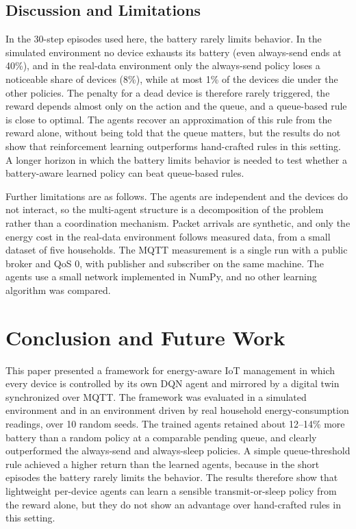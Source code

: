 \documentclass[conference]{IEEEtran}
\begin{document}
\subsection{Discussion and Limitations}
In the 30-step episodes used here, the battery rarely limits behavior. In the simulated environment no device exhausts its battery (even always-send ends at 40\%), and in the real-data environment only the always-send policy loses a noticeable share of devices (8\%), while at most 1\% of the devices die under the other policies. The penalty for a dead device is therefore rarely triggered, the reward depends almost only on the action and the queue, and a queue-based rule is close to optimal. The agents recover an approximation of this rule from the reward alone, without being told that the queue matters, but the results do not show that reinforcement learning outperforms hand-crafted rules in this setting. A longer horizon in which the battery limits behavior is needed to test whether a battery-aware learned policy can beat queue-based rules.

Further limitations are as follows. The agents are independent and the devices do not interact, so the multi-agent structure is a decomposition of the problem rather than a coordination mechanism. Packet arrivals are synthetic, and only the energy cost in the real-data environment follows measured data, from a small dataset of five households. The MQTT measurement is a single run with a public broker and QoS 0, with publisher and subscriber on the same machine. The agents use a small network implemented in NumPy, and no other learning algorithm was compared.

\section{Conclusion and Future Work}
\label{sec:conclusion}

This paper presented a framework for energy-aware IoT management in which every device is controlled by its own DQN agent and mirrored by a digital twin synchronized over MQTT. The framework was evaluated in a simulated environment and in an environment driven by real household energy-consumption readings, over 10 random seeds. The trained agents retained about 12--14\% more battery than a random policy at a comparable pending queue, and clearly outperformed the always-send and always-sleep policies. A simple queue-threshold rule achieved a higher return than the learned agents, because in the short episodes the battery rarely limits the behavior. The results therefore show that lightweight per-device agents can learn a sensible transmit-or-sleep policy from the reward alone, but they do not show an advantage over hand-crafted rules in this setting.
\end{document}
